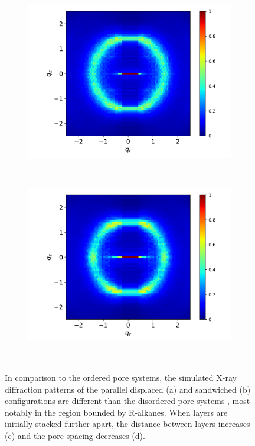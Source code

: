 \documentclass{article}
\begin{document}
\begin{figure}[!hbt]
\begin{subfigure}{0.45\linewidth}
                \caption{}~\label{fig:p2p_disordered}
        \end{subfigure}
        \begin{subfigure}{0.45\linewidth}
                \centering
                \includegraphics[width=\linewidth]{offset_disordered_rzplot.png}
                \caption{}~\label{fig:offset_disordered_xrd}
        \end{subfigure}%
        \begin{subfigure}{0.45\linewidth}
                \centering
                \includegraphics[width=\linewidth]{layered_disordered_rzplot.png}
                \caption{}~\label{fig:layered_disordered_xrd}
        \end{subfigure}
	\caption{In comparison to the ordered pore systems, the simulated
		X-ray diffraction patterns of the parallel displaced (a) and sandwiched (b)
		configurations are different than the disordered pore systems , most notably in
		the region bounded by R-alkanes.  When layers are initially stacked further
		apart, the distance between layers increases (c) and the pore spacing decreases
		(d).}
  \end{figure}
\end{document}
